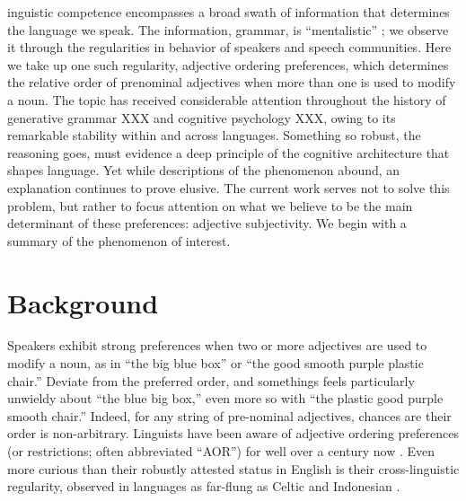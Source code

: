 \documentclass{pnastwo}
\begin{document}
\begin{article}
\begin{abstract}
{Abstract here\ldots}
\end{abstract}



inguistic competence encompasses a broad swath of information that determines the language we speak. The information, grammar, is ``mentalistic'' \cite{chomsky1965}; we observe it through the regularities in behavior of speakers and speech communities. Here we take up one such regularity, adjective ordering preferences, which determines the relative order of prenominal adjectives when more than one is used to modify a noun. The topic has received considerable attention throughout the history of generative grammar XXX and cognitive psychology XXX, owing to its remarkable stability within and across languages. Something so robust, the reasoning goes, must evidence a deep principle of the cognitive architecture that shapes language. Yet while descriptions of the phenomenon abound, an explanation continues to prove elusive. The current work serves not to solve this problem, but rather to focus attention on what we believe to be the main determinant of these preferences: adjective subjectivity. We begin with a summary of the phenomenon of interest.

\section{Background}
Speakers exhibit strong preferences when two or more adjectives are used to modify a noun, as in ``the big blue box'' or ``the good smooth purple plastic chair.'' Deviate from the preferred order, and somethings feels particularly unwieldy about ``the blue big box,'' even more so with ``the plastic good purple smooth chair.'' Indeed, for any string of pre-nominal adjectives, chances are their order is non-arbitrary. Linguists have been aware of adjective ordering preferences (or restrictions; often abbreviated ``AOR'') for well over a century now \cite{sweet1898,bloomfield1933}. Even more curious than their robustly attested status in English is their cross-linguistic regularity, observed in languages as far-flung as Celtic \cite{sproatshih1991} and Indonesian \cite{martin1969competence}.

\end{article}
\end{document}
